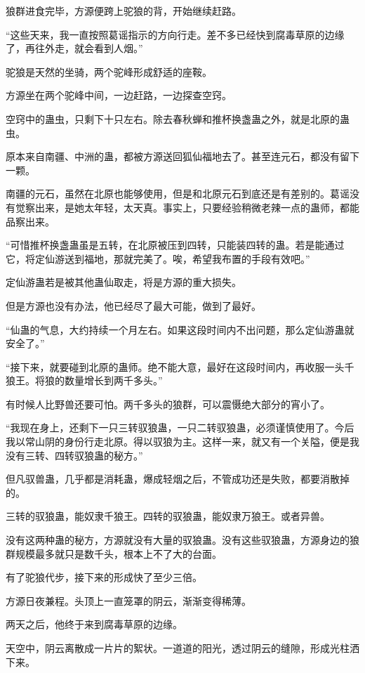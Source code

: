 
\begin{this_body}

狼群进食完毕，方源便跨上驼狼的背，开始继续赶路。

“这些天来，我一直按照葛谣指示的方向行走。差不多已经快到腐毒草原的边缘了，再往外走，就会看到人烟。”

驼狼是天然的坐骑，两个驼峰形成舒适的座鞍。

方源坐在两个驼峰中间，一边赶路，一边探查空窍。

空窍中的蛊虫，只剩下十只左右。除去春秋蝉和推杯换盏蛊之外，就是北原的蛊虫。

原本来自南疆、中洲的蛊，都被方源送回狐仙福地去了。甚至连元石，都没有留下一颗。

南疆的元石，虽然在北原也能够使用，但是和北原元石到底还是有差别的。葛谣没有觉察出来，是她太年轻，太天真。事实上，只要经验稍微老辣一点的蛊师，都能品察出来。

“可惜推杯换盏蛊虽是五转，在北原被压到四转，只能装四转的蛊。若是能通过它，将定仙游送到福地，那就完美了。唉，希望我布置的手段有效吧。”

定仙游蛊若是被其他蛊仙取走，将是方源的重大损失。

但是方源也没有办法，他已经尽了最大可能，做到了最好。

“仙蛊的气息，大约持续一个月左右。如果这段时间内不出问题，那么定仙游蛊就安全了。”

“接下来，就要碰到北原的蛊师。绝不能大意，最好在这段时间内，再收服一头千狼王。将狼的数量增长到两千多头。”

有时候人比野兽还要可怕。两千多头的狼群，可以震慑绝大部分的宵小了。

“我现在身上，还剩下一只三转驭狼蛊，一只二转驭狼蛊，必须谨慎使用了。今后我以常山阴的身份行走北原。得以驭狼为主。这样一来，就又有一个关隘，便是我没有三转、四转驭狼蛊的秘方。”

但凡驭兽蛊，几乎都是消耗蛊，爆成轻烟之后，不管成功还是失败，都要消散掉的。

三转的驭狼蛊，能奴隶千狼王。四转的驭狼蛊，能奴隶万狼王。或者异兽。

没有这两种蛊的秘方，方源就没有大量的驭狼蛊。没有这些驭狼蛊，方源身边的狼群规模最多就只是数千头，根本上不了大的台面。

有了驼狼代步，接下来的形成快了至少三倍。

方源日夜兼程。头顶上一直笼罩的阴云，渐渐变得稀薄。

两天之后，他终于来到腐毒草原的边缘。

天空中，阴云离散成一片片的絮状。一道道的阳光，透过阴云的缝隙，形成光柱洒下来。


\end{this_body}
